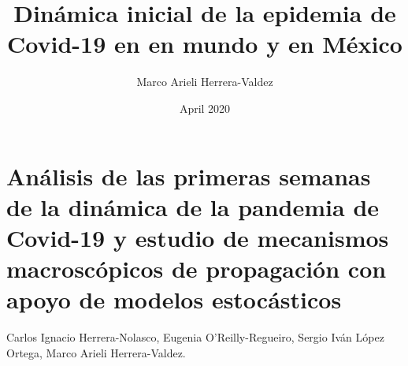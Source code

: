\documentclass[8pt]{article}
\title{Dinámica inicial de la epidemia de Covid-19 en en mundo y en México }
\author{Marco Arieli Herrera-Valdez}
\date{April 2020}
\begin{document}
%
%
\section*{Análisis de las primeras semanas de la dinámica de la pandemia de {Covid-19} y estudio de mecanismos macroscópicos de propagación con apoyo de modelos estocásticos}
Carlos Ignacio Herrera-Nolasco, Eugenia O'Reilly-Regueiro, Sergio Iván López Ortega, Marco Arieli Herrera-Valdez. 







\newpage


\end{document}
